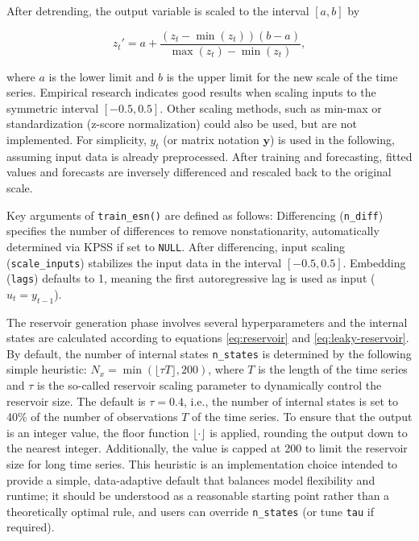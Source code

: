 After detrending, the output variable is scaled to the interval \([a, b]\) by

\begin{equation}
z_{t}' = a + \frac{(z_t - \min(z_t))(b-a)}{\max(z_t)-\min(z_t)},
\label{eq:scaling}
\end{equation}

where \(a\) is the lower limit and \(b\) is the upper limit for the new scale of the time series. Empirical research indicates good results when scaling inputs to the symmetric interval \([-0.5, 0.5]\). Other scaling methods, such as min-max or standardization (z-score normalization) could also be used, but are not implemented. For simplicity, \(y_t\) (or matrix notation \(\mathbf{y}\)) is used in the following, assuming input data is already preprocessed. After training and forecasting, fitted values and forecasts are inversely differenced and rescaled back to the original scale.

Key arguments of \texttt{train\_esn()} are defined as follows: Differencing (\texttt{n\_diff}) specifies the number of differences to remove nonstationarity, automatically determined via KPSS if set to \texttt{NULL}. After differencing, input scaling (\texttt{scale\_inputs}) stabilizes the input data in the interval \([-0.5, 0.5]\). Embedding (\texttt{lags}) defaults to 1, meaning the first autoregressive lag is used as input (\(u_t = y_{t-1}\)).

The reservoir generation phase involves several hyperparameters and the internal states are calculated according to equations \eqref{eq:reservoir} and \eqref{eq:leaky-reservoir}. By default, the number of internal states \texttt{n\_states} is determined by the following simple heuristic: \(N_x = \min(\lfloor \tau T \rfloor, 200)\), where \(T\) is the length of the time series and \(\tau\) is the so-called reservoir scaling parameter to dynamically control the reservoir size. The default is \(\tau = 0.4\), i.e., the number of internal states is set to 40\% of the number of observations \(T\) of the time series. To ensure that the output is an integer value, the floor function \(\lfloor \cdot \rfloor\) is applied, rounding the output down to the nearest integer. Additionally, the value is capped at 200 to limit the reservoir size for long time series. This heuristic is an implementation choice intended to provide a simple, data-adaptive default that balances model flexibility and runtime; it should be understood as a reasonable starting point rather than a theoretically optimal rule, and users can override \texttt{n\_states} (or tune \texttt{tau} if required).

